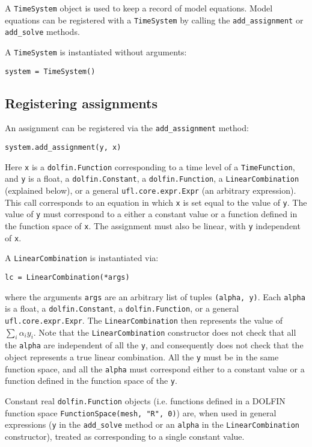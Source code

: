 \documentclass[a4paper]{book}
\begin{document}
A \verb+TimeSystem+ object is used to keep a record of model equations.
Model equations can be registered with a \verb+TimeSystem+ by calling the
\verb+add_assignment+ or \verb+add_solve+ methods.

A \verb+TimeSystem+ is instantiated without arguments:
\begin{lstlisting}
system = TimeSystem()
\end{lstlisting}

\subsection{Registering assignments}\label{sect:assignments}

An assignment can be registered via the \verb+add_assignment+ method:
\begin{lstlisting}
system.add_assignment(y, x)
\end{lstlisting}
Here \verb+x+ is a \verb+dolfin.Function+ corresponding to a time level of a
\verb+TimeFunction+, and \verb+y+ is a float, a \verb+dolfin.Constant+, a
\verb+dolfin.Function+, a \verb+LinearCombination+ (explained below), or a
general \verb+ufl.core.expr.Expr+ (an arbitrary expression). This call
corresponds to an equation in which \verb+x+ is set equal to the value of
\verb+y+. The value of \verb+y+ must correspond to a either a constant value or
a function defined in the function space of \verb+x+. The assignment must also
be linear, with \verb+y+ independent of \verb+x+.

A \verb+LinearCombination+ is instantiated via:
\begin{lstlisting}
lc = LinearCombination(*args)
\end{lstlisting}
where the arguments \verb+args+ are an arbitrary list of tuples
\verb+(alpha, y)+. Each \verb+alpha+ is a float, a \verb+dolfin.Constant+, a
\verb+dolfin.Function+, or a general \linebreak \verb+ufl.core.expr.Expr+. The
\verb+LinearCombination+ then represents the value of $\sum_i \alpha_i y_i$.
Note that the \verb+LinearCombination+ constructor does not check that all the
\verb+alpha+ are independent of all the \verb+y+, and consequently does not
check that the object represents a true linear combination. All the \verb+y+
must be in the same function space, and all the \verb+alpha+ must correspond
either to a constant value or a function defined in the function space of the
\verb+y+.

Constant real \verb+dolfin.Function+ objects (i.e. functions defined in a
DOLFIN function space \verb+FunctionSpace(mesh, "R", 0)+) are, when used in
general expressions (\verb+y+ in the \verb+add_solve+ method or an \verb+alpha+
in the \verb+LinearCombination+ constructor), treated as corresponding to a
single constant value.
\end{document}
